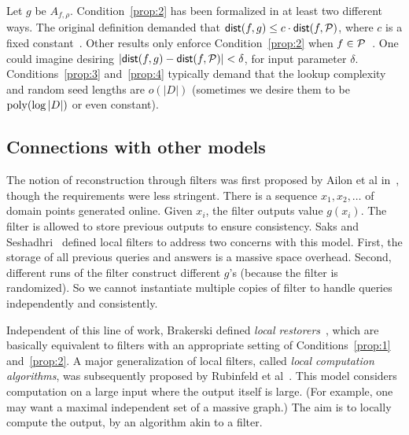 \documentclass[natbib]{svcyclop}
\def\dist{{\sf dist}}
\begin{document}
Let $g$ be $A_{f,\rho}$. Condition~\ref{prop:2} has been formalized in at least two different ways. The original definition demanded that $\dist(f,g) \leq c\cdot \dist(f,\cP)$,
where $c$ is a fixed constant~\cite{SS06}. Other results only enforce Condition~\ref{prop:2} when
$f \in \mathcal{P}$~\cite{JhRa13,AwJh+12}. One could imagine desiring $|\dist(f,g) - \dist(f,\cP)| < \delta$,
for input parameter $\delta$.
%
Conditions~\ref{prop:3} and~\ref{prop:4} typically demand that the lookup complexity and random
seed lengths are $o(|D|)$ (sometimes we desire them to be $\mathrm{poly}(\log |D|)$ or even constant). 


%
%


\subsection{Connections with other models}


The notion of reconstruction through filters was first proposed by Ailon et al in~\cite{ACCL2},
though the requirements were less stringent. There is a sequence $x_1, x_2, \ldots$ of domain points generated
online. Given $x_i$, the filter outputs value $g(x_i)$. 
The filter is allowed to store previous outputs to ensure consistency. 
Saks and Seshadhri~\cite{SS06} defined local filters to address two concerns with this model.
First, the storage of all previous queries and answers is a massive space overhead. Second,
different runs of the filter construct different $g$'s (because the filter is randomized).
So we cannot instantiate multiple copies of filter to handle queries independently and consistently.

Independent of this line of work, Brakerski defined \emph{local restorers}~\cite{Br08}, which are basically
equivalent to filters with an appropriate setting of Conditions~\ref{prop:1} and~\ref{prop:2}.
A major generalization of local filters, called \emph{local computation algorithms}, was subsequently proposed
by Rubinfeld et al~\cite{RuTaVa+11}. This model considers computation on a large input where the output itself
is large. (For example, one may want a maximal independent set of a massive graph.) 
The aim is to locally compute the output, by an algorithm akin to a filter.
\end{document}
